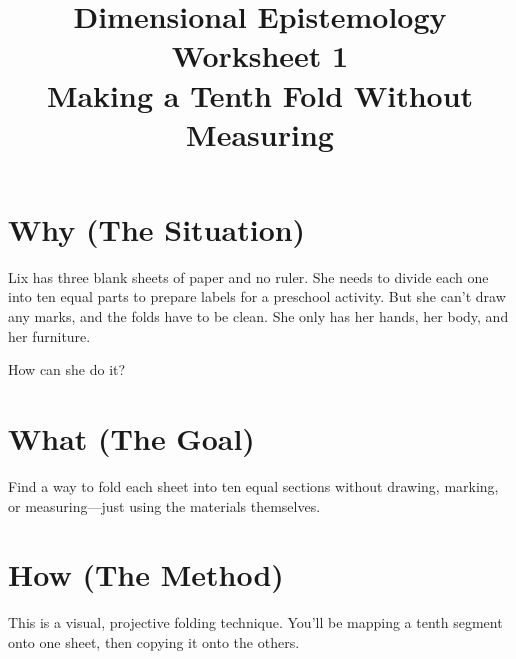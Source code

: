 \documentclass[11pt]{article}
\title{\vspace{-2cm}Dimensional Epistemology Worksheet 1\\
\Large{Making a Tenth Fold Without Measuring}}
\date{}
\author{}
\begin{document}
\maketitle

\section*{Why (The Situation)}

Lix has three blank sheets of paper and no ruler. She needs to divide each one into ten equal parts to prepare labels for a preschool activity. But she can’t draw any marks, and the folds have to be clean. She only has her hands, her body, and her furniture.

How can she do it?

\section*{What (The Goal)}

Find a way to fold each sheet into ten equal sections without drawing, marking, or measuring—just using the materials themselves.

\section*{How (The Method)}

This is a visual, projective folding technique. You'll be mapping a tenth segment onto one sheet, then copying it onto the others.
\end{document}
